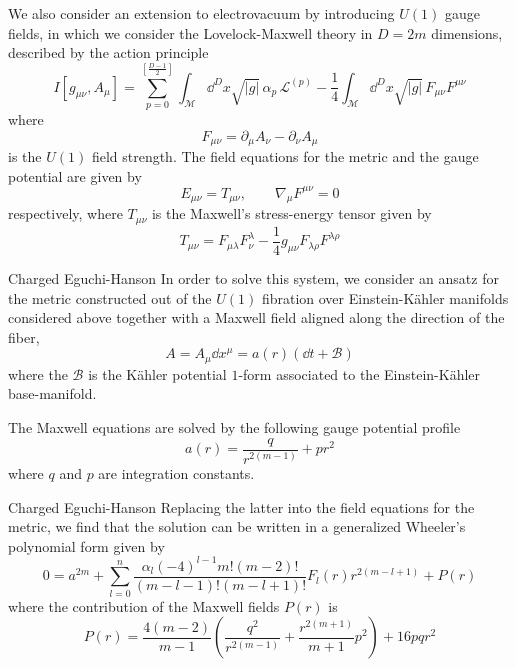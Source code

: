 \documentclass[aspectratio=169,xcolor=dvipsnames]{beamer}
\begin{document}
\begin{frame}
We also consider an extension to electrovacuum by introducing $U(1)$ gauge fields, in which we consider the Lovelock-Maxwell theory in $D=2m$ dimensions, described by the action principle
\begin{equation}
  I[g_{\mu\nu},A_\mu] = \sum_{p=0}^{\left[\frac{D-1}{2} \right]}\int_{\mathcal{M}}\dd^D x \sqrt{|g|}\,\alpha_p\,{\mathscr{L}}^{(p)} - \frac{1}{4}\int_{\mathcal{M}}\dd^Dx\sqrt{|g|}\,F_{\mu\nu}F^{\mu\nu}
\end{equation}
where 
\begin{equation*}
  F_{\mu\nu }=\partial_\mu  A_\nu  -\partial_\nu  A_\mu 
\end{equation*}
is the $U(1)$ field strength. The field equations for the metric and the gauge potential are given by 
\begin{equation}
  E_{\mu\nu }=T_{\mu\nu },\qquad \nabla_\mu F^{\mu\nu }=0
\end{equation}
respectively, where $T_{\mu\nu }$ is the Maxwell's stress-energy tensor given by
\begin{equation}
  T_{\mu\nu }=F_{\mu\lambda}F_\nu ^{\lambda}-\frac{1}{4}g_{\mu\nu }F_{\lambda\rho }F^{\lambda\rho }
\end{equation}


\end{frame}

\begin{frame}{Charged Eguchi-Hanson}
	In order to solve this system, we consider an ansatz for the metric constructed out of the $U(1)$ fibration over Einstein-K\"ahler manifolds considered above together with a Maxwell field aligned along the direction of the fiber,
	\begin{equation*}
  A=A_\mu\dd x^\mu =a(r)(\dd t+\mathcal{B})
\end{equation*}
where the $\mathcal{B}$ is the K\"ahler potential $1$-form associated to the Einstein-K\"ahler base-manifold.

The Maxwell equations are solved by the following gauge potential profile
\begin{equation*}
  a(r)=\frac{q}{r^{2(m-1)}}+pr^2
\end{equation*}
where $q$ and $p$ are integration constants.
\end{frame}

\begin{frame}{Charged Eguchi-Hanson}
	Replacing the latter into the field equations for the metric, we find that the solution can be written in a generalized Wheeler's polynomial form given by
	\begin{equation*}
  0 = a^{2m} +\sum_{l=0}^{n}\frac{\alpha_l(-4)^{l-1}m!(m-2)!}{(m-l-1)!(m-l+1)!}F_l(r)r^{2(m-l+1)} + P(r)
\end{equation*}
where the contribution of the Maxwell fields $P(r)$ is
\begin{equation*}
  P(r) = \frac{4(m-2)}{m-1}\left(\frac{q^2}{r^{2(m-1)}}+\frac{r^{2(m+1)}}{m+1}p^2\right)+16pq r^2
\end{equation*}
\end{frame}
\end{document}
